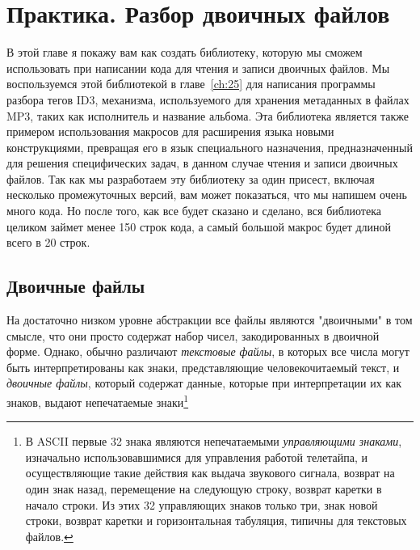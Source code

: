 
\chapter{Практика. Разбор двоичных файлов}
\label{ch:24}

В этой главе я покажу вам как создать библиотеку, которую мы сможем использовать при
написании кода для чтения и записи двоичных файлов. Мы воспользуемся этой библиотекой в
главе~\ref{ch:25} для написания программы разбора тегов ID3, механизма, используемого для
хранения метаданных в файлах MP3, таких как исполнитель и название альбома. Эта библиотека
является также примером использования макросов для расширения языка новыми конструкциями,
превращая его в язык специального назначения, предназначенный для решения специфических
задач, в данном случае чтения и записи двоичных файлов. Так как мы разработаем эту
библиотеку за один присест, включая несколько промежуточных версий, вам может показаться,
что мы напишем очень много кода. Но после того, как все будет сказано и сделано, вся
библиотека целиком займет менее 150 строк кода, а самый большой макрос будет длиной всего
в 20 строк.

\section{Двоичные файлы}

На достаточно низком уровне абстракции все файлы являются "двоичными" в том смысле, что
они просто содержат набор чисел, закодированных в двоичной форме.  Однако, обычно
различают \textit{текстовые файлы}, в которых все числа могут быть интерпретированы как
знаки, представляющие человекочитаемый текст, и \textit{двоичные файлы}, который содержат
данные, которые при интерпретации их как знаков, выдают непечатаемые знаки\footnote{В
  ASCII первые 32 знака являются непечатаемыми \textit{управляющими знаками}, изначально
  использовавшимися для управления работой телетайпа, и осуществляющие такие действия как
  выдача звукового сигнала, возврат на один знак назад, перемещение на следующую строку,
  возврат каретки в начало строки. Из этих 32 управляющих знаков только три, знак новой
  строки, возврат каретки и горизонтальная табуляция, типичны для текстовых файлов.}

